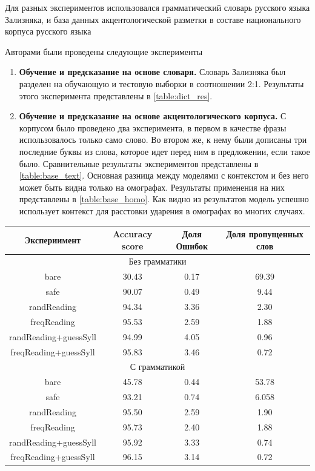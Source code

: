 \documentclass[14pt, a4paper, russian]{report}
\begin{document}
\begin{normalsize}
Для разных экспериментов использовался грамматический словарь русского языка Зализняка,\cite{zaliz} и база данных акцентологической разметки в составе национального корпуса русского языка\cite{grishina} 

Авторами были проведены следующие эксперименты
\begin{enumerate}
	\item \textbf{Обучение и предсказание на основе словаря.} Словарь Зализняка был разделен на обучающую и тестовую выборки в соотношении 2:1. Результаты этого эксперимента представлены в \cref{table:dict_res}.
	\item \textbf{Обучение и предсказание на основе акцентологического корпуса.} С корпусом было проведено два эксперимента, в первом в качестве фразы использовалось только само слово. Во втором же, к нему были дописаны три последние буквы из слова, которое идет перед ним в предложении, если такое было. Сравнительные результаты экспериментов представлены в \cref{table:base_text}. Основная разница между моделями с контекстом и без него может быть видна только на омографах. Результаты применения на них представлены в \cref{table:base_homo}. Как видно из результатов модель успешно использует контекст для расстовки ударения в омографах во многих случаях.
\end{enumerate}

\begin{table}[H]
	\begin{small}
		\begin{center}
			\begin{tabular}{|c|c|c|c|}
				\hline
				Экспериимент & Accuracy score & Доля Ошибок & Доля пропущенных слов\\
				\hline
				\multicolumn{4}{|c|}{Без грамматики} \\			
				\hline
				bare & 30.43 & 0.17 & 69.39 \\
				\hline
				safe & 90.07 & 0.49 & 9.44 \\
				\hline
				randReading &94.34 &3.36 &2.30 \\
				\hline
				freqReading &95.53 &2.59& 1.88 \\
				\hline
				randReading+guessSyll &94.99 &4.05 &0.96 \\
				\hline
				freqReading+guessSyll & 95.83 &3.46 &0.72\\
				\hline
				\multicolumn{4}{|c|}{С грамматикой} \\			
				\hline
				bare &45.78 & 0.44 &53.78\\
				\hline
				safe &93.21& 0.74 &6.058 \\
				\hline
				randReading &95.50 &2.59 &1.90 \\
				\hline
				freqReading &95.73 &2.40 &1.88 \\
				\hline
				randReading+guessSyll &95.92 &3.33 &0.74 \\
				\hline
				freqReading+guessSyll &96.15 &3.14 &0.72 \\
				\hline
				

\end{tabular}
\end{center}
\end{small}
\end{table}
\end{normalsize}
\end{document}
